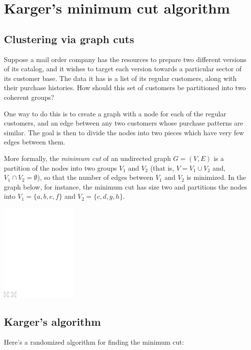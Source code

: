 \section{Karger's minimum cut algorithm}

\subsection{Clustering via graph cuts}

Suppose a mail order company has the resources to prepare two different versions of 
its catalog, and it wishes to target each version towards a particular sector of its 
customer base. The data it has is a list of its regular customers, along with their 
purchase histories. How should this set of customers be partitioned into two coherent 
groups?

One way to do this is to create a graph with a node for each of the regular customers,
and an edge between any two customers whose purchase patterns are similar. The goal is
then to divide the nodes into two pieces which have very few edges between them.

More formally, the {\it minimum cut} of an undirected graph $G = (V,E)$ is a partition
of the nodes into two groups $V_1$ and $V_2$ (that is, $V = V_1 \cup V_2$ and, 
$V_1 \cap V_2 = \emptyset$), so that the number of edges between $V_1$ and $V_2$ is
minimized. In the graph below, for instance, the minimum cut has size two and partitions
the nodes into $V_1 = \{a,b,e,f\}$ and $V_2 = \{c,d,g,h\}$.

\begin{center}
\includegraphics[width=1.5in]{figs/mincut}
\end{center}

\subsection{Karger's algorithm}

Here's a randomized algorithm for finding the minimum cut:


